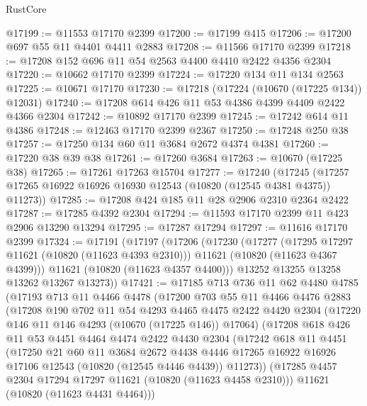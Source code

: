 \begin{lexlean}{RustCore}
\begin{coremodule}
@17199 := @11553 @17170 @2399
@17200 := @17199 @415
@17206 := @17200 @697 @55 @11 @4401 @4411 @2883
@17208 := @11566 @17170 @2399
@17218 := @17208 @152 @696 @11 @54 @2563 @4400 @4410 @2422 @4356 @2304
@17220 := @10662 @17170 @2399
@17224 := @17220 @134 @11 @134 @2563
@17225 := @10671 @17170
@17230 := @17218 (@17224 (@10670 (@17225 @134)) @12031)
@17240 := @17208 @614 @426 @11 @53 @4386 @4399 @4409 @2422 @4366 @2304
@17242 := @10892 @17170 @2399
@17245 := @17242 @614 @11 @4386
@17248 := @12463 @17170 @2399 @2367
@17250 := @17248 @250 @38
@17257 := @17250 @134 @60 @11 @3684 @2672 @4374 @4381
@17260 := @17220 @38 @39 @38
@17261 := @17260 @3684
@17263 := @10670 (@17225 @38)
@17265 := @17261 @17263 @15704
@17277 := @17240
    (@17245 (@17257 @17265 @16922 @16926 @16930 @12543 (@10820 (@12545 @4381 @4375)) @11273))
@17285 := @17208 @424 @185 @11 @28 @2906 @2310 @2364 @2422
@17287 := @17285 @4392 @2304
@17294 := @11593 @17170 @2399 @11 @423 @2906 @13290 @13294
@17295 := @17287 @17294
@17297 := @11616 @17170 @2399
@17324 := @17191
    (@17197
      (@17206
        (@17230
          (@17277
            (@17295 @17297 @11621 (@10820 (@11623 @4393 @2310)))
            @11621
            (@10820 (@11623 @4367 @4399)))
          @11621
          (@10820 (@11623 @4357 @4400)))
        @13252
        @13255
        @13258
        @13262
        @13267
        @13273))
@17421 := @17185
    @713
    @736
    @11
    @62
    @4480
    @4785
    (@17193
      @713
      @11
      @4466
      @4478
      (@17200
        @703
        @55
        @11
        @4466
        @4476
        @2883
        (@17208
          @190
          @702
          @11
          @54
          @4293
          @4465
          @4475
          @2422
          @4420
          @2304
          (@17220 @146 @11 @146 @4293 (@10670 (@17225 @146)) @17064)
          (@17208
            @618
            @426
            @11
            @53
            @4451
            @4464
            @4474
            @2422
            @4430
            @2304
            (@17242
              @618
              @11
              @4451
              (@17250
                @21
                @60
                @11
                @3684
                @2672
                @4438
                @4446
                @17265
                @16922
                @16926
                @17106
                @12543
                (@10820 (@12545 @4446 @4439))
                @11273))
            (@17285 @4457 @2304 @17294 @17297 @11621 (@10820 (@11623 @4458 @2310)))
            @11621
            (@10820 (@11623 @4431 @4464)))

\end{coremodule}
\end{lexlean}
